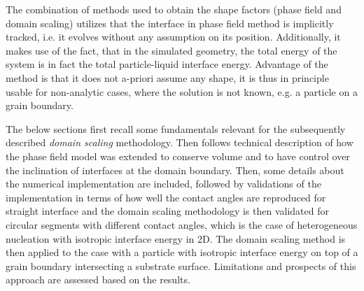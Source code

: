 
The combination of methods used to obtain the shape factors (phase field and domain scaling) utilizes that the interface in phase field method is implicitly tracked, i.e. it evolves without any assumption on its position. Additionally, it makes use of the fact, that in the simulated geometry, the total energy of the system is in fact the total particle-liquid interface energy. Advantage of the method is that it does not a-priori assume any shape, it is thus in principle usable for non-analytic cases, where the solution is not known, e.g. a particle on a grain boundary.

The below sections first recall some fundamentals relevant for the subsequently described \textit{domain scaling} methodology. Then follows technical description of how the phase field model was extended to conserve volume and to have control over the inclination of interfaces at the domain boundary. Then, some details about the numerical implementation are included, followed by validations of the implementation in terms of how well the contact angles are reproduced for straight interface and the domain scaling methodology is then validated for circular segments with different contact angles, which is the case of heterogeneous nucleation with isotropic interface energy in 2D. The domain scaling method is then applied to the case with a particle with isotropic interface energy on top of a grain boundary intersecting a substrate surface. Limitations and prospects of this approach are assessed based on the results.


%


